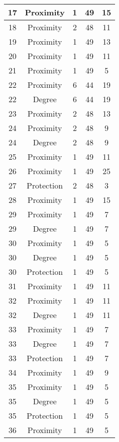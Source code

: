 \documentclass[results.tex]{subfiles}
\begin{document}
\begin{center}
\begin{tabular}{| c || c | c | c | c |}
    17 & Proximity & 1 & 49 & 15 \\ 
    \hline
    18 & Proximity & 2 & 48 & 11 \\ 
    \hline
    19 & Proximity & 1 & 49 & 13 \\ 
    \hline
    20 & Proximity & 1 & 49 & 11 \\ 
    \hline
    21 & Proximity & 1 & 49 & 5 \\ 
    \hline
    22 & Proximity & 6 & 44 & 19 \\ 
    \hline
    22 & Degree & 6 & 44 & 19 \\ 
    \hline
    23 & Proximity & 2 & 48 & 13 \\ 
    \hline
    24 & Proximity & 2 & 48 & 9 \\ 
    \hline
    24 & Degree & 2 & 48 & 9 \\ 
    \hline
    25 & Proximity & 1 & 49 & 11 \\ 
    \hline
    26 & Proximity & 1 & 49 & 25 \\ 
    \hline
    27 & Protection & 2 & 48 & 3 \\ 
    \hline
    28 & Proximity & 1 & 49 & 15 \\ 
    \hline
    29 & Proximity & 1 & 49 & 7 \\ 
    \hline
    29 & Degree & 1 & 49 & 7 \\ 
    \hline
    30 & Proximity & 1 & 49 & 5 \\ 
    \hline
    30 & Degree & 1 & 49 & 5 \\ 
    \hline
    30 & Protection & 1 & 49 & 5 \\ 
    \hline
    31 & Proximity & 1 & 49 & 11 \\ 
    \hline
    32 & Proximity & 1 & 49 & 11 \\ 
    \hline
    32 & Degree & 1 & 49 & 11 \\ 
    \hline
    33 & Proximity & 1 & 49 & 7 \\ 
    \hline
    33 & Degree & 1 & 49 & 7 \\ 
    \hline
    33 & Protection & 1 & 49 & 7 \\ 
    \hline
    34 & Proximity & 1 & 49 & 9 \\ 
    \hline
    35 & Proximity & 1 & 49 & 5 \\ 
    \hline
    35 & Degree & 1 & 49 & 5 \\ 
    \hline
    35 & Protection & 1 & 49 & 5 \\ 
    \hline
    36 & Proximity & 1 & 49 & 5 \\ 
    \hline

\end{tabular}
\end{center}
\end{document}
